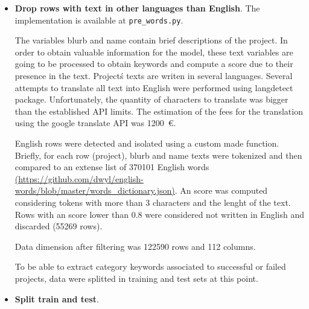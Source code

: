 \documentclass{article}
\begin{document}
\begin{itemize}
\begin{itemize}
	The number of columns was reduced to 125.
	
	\item  Currency pruning.
	The implementation is available at {\tt pre\_currency\_pruning.py}.
	
	Currency encodes 14 different levels. Count plots and percentages of succesfull projects were computed for tha variable 'currency\_orig'. Currencies with more than 55\% of successful projects were retained (GBP, HKD, SGD, JPY) and compared to the retained countries. All currency levels were dropped because the selected currencies correspond to countries that were already selected and the information was redundant.
	
	The number of columns was reduced to 112.
        
    \end{itemize}
    \item \textbf{Drop rows with text in other languages than English}.
    The implementation is available at {\tt pre\_words.py}.
    
    The variables blurb and name contain brief descriptions of the project. In order to obtain valuable information for the model, these text variables are going to be processed to obtain keywords and compute a score due to their presence in the text. Project\'s texts are writen in several languages. Several attempts to translate all text into English were performed using langdetect package. Unfortunately, the quantity of characters to translate was bigger than the established API limits. The estimation of the fees for the translation using the google translate API was 1200~\euro.
    
    English rows were detected and isolated using a custom made function. Briefly, for each row (project), blurb and name texts were tokenized and then compared to an extense list of 370101 English words \url{(https://github.com/dwyl/english-words/blob/master/words_dictionary.json)}. An score was computed considering tokens with more than 3 characters and the lenght of the text. Rows with an score lower than 0.8 were considered not written in English and discarded (55269 rows).
    
    Data dimension after filtering was 122590 rows and 112 columns.
    
    To be able to extract category keywords associated to successful or failed projects, data were splitted in training and test sets at this point.
    
    \item \textbf{Split train and test}.
    

\end{itemize}
\end{document}
